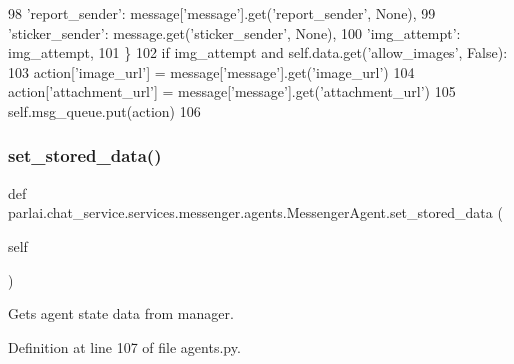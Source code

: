 \begin{DoxyCode}
98                 \textcolor{stringliteral}{'report\_sender'}: message[\textcolor{stringliteral}{'message'}].get(\textcolor{stringliteral}{'report\_sender'}, \textcolor{keywordtype}{None}),
99                 \textcolor{stringliteral}{'sticker\_sender'}: message.get(\textcolor{stringliteral}{'sticker\_sender'}, \textcolor{keywordtype}{None}),
100                 \textcolor{stringliteral}{'img\_attempt'}: img\_attempt,
101             \}
102             \textcolor{keywordflow}{if} img\_attempt \textcolor{keywordflow}{and} self.data.get(\textcolor{stringliteral}{'allow\_images'}, \textcolor{keyword}{False}):
103                 action[\textcolor{stringliteral}{'image\_url'}] = message[\textcolor{stringliteral}{'message'}].get(\textcolor{stringliteral}{'image\_url'})
104                 action[\textcolor{stringliteral}{'attachment\_url'}] = message[\textcolor{stringliteral}{'message'}].get(\textcolor{stringliteral}{'attachment\_url'})
105             self.msg\_queue.put(action)
106 
\end{DoxyCode}
\mbox{\label{classparlai_1_1chat__service_1_1services_1_1messenger_1_1agents_1_1MessengerAgent_a29c5373354ffdbef8fbd140861c300e8}} 
\subsubsection{\texorpdfstring{set\+\_\+stored\+\_\+data()}{set\_stored\_data()}}
{\footnotesize\ttfamily def parlai.\+chat\+\_\+service.\+services.\+messenger.\+agents.\+Messenger\+Agent.\+set\+\_\+stored\+\_\+data (\begin{DoxyParamCaption}\item[{}]{self }\end{DoxyParamCaption})}

\begin{DoxyVerb}Gets agent state data from manager.
\end{DoxyVerb}
 

Definition at line 107 of file agents.\+py.


